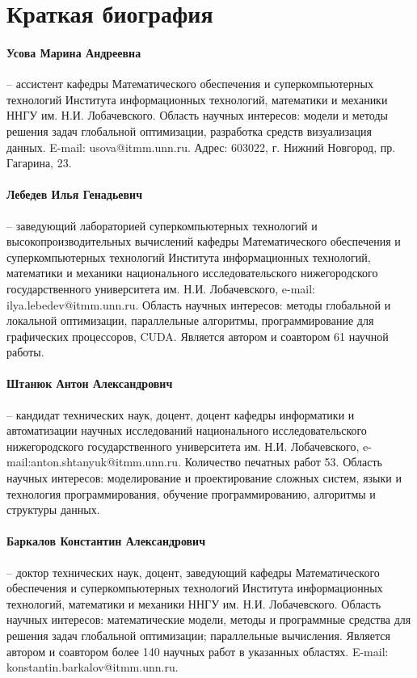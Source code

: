 \documentclass[a4paper,12pt,russian]{article}
\begin{document}

\section*{Краткая биография}
\paragraph{Усова Марина Андреевна} -- ассистент кафедры Математического обеспечения и суперкомпьютерных технологий Института информационных технологий, математики и механики ННГУ им. Н.И. Лобачевского. Область научных интересов: модели и методы решения задач глобальной оптимизации, разработка средств визуализация данных. E-mail: usova@itmm.unn.ru. Адрес: 603022, г. Нижний Новгород, пр. Гагарина, 23.
\paragraph{Лебедев Илья Генадьевич} -- заведующий лабораторией суперкомпьютерных технологий и высокопроизводительных вычислений кафедры Математического обеспечения и суперкомпьютерных технологий Института информационных технологий, математики и механики национального исследовательского нижегородского государственного университета им. Н.И. Лобачевского, e-mail: ilya.lebedev@itmm.unn.ru. Область научных интересов: методы глобальной и локальной оптимизации, параллельные алгоритмы, программирование для графических процессоров, CUDA. Является автором и соавтором 61 научной работы.
\paragraph{Штанюк Антон Александрович} -- кандидат технических наук, доцент, доцент кафедры информатики и автоматизации научных исследований национального исследовательского нижегородского государственного университета им. Н.И. Лобачевского, e-mail:anton.shtanyuk@itmm.unn.ru. Количество печатных работ 53. Область научных интересов: моделирование и проектирование сложных систем, языки и технология программирования, обучение программированию, алгоритмы и структуры данных.
\paragraph{Баркалов Константин Александрович} -- 
доктор технических наук, доцент, заведующий кафедры Математического обеспечения и суперкомпьютерных технологий Института информационных технологий, математики и механики ННГУ им. Н.И. Лобачевского. Область научных интересов: математические модели, методы и программные средства для решения задач глобальной оптимизации; параллельные вычисления. Является автором и соавтором более 140 научных работ в указанных областях. E-mail: konstantin.barkalov@itmm.unn.ru. 
\end{document}
